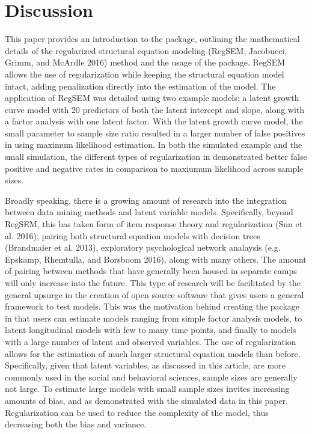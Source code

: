 \documentclass[article]{jss}
\begin{document}
\section{Discussion}\label{discussion}

This paper provides an introduction to the  package,
outlining the mathematical details of the regularized structural
equation modeling (RegSEM; Jacobucci, Grimm, and McArdle 2016) method
and the usage of the  package. RegSEM allows the use of
regularization while keeping the structural equation model intact,
adding penalization directly into the estimation of the model. The
application of RegSEM was detailed using two example models: a latent
growth curve model with 20 predictors of both the latent intercept and
slope, along with a factor analysis with one latent factor. With the
latent growth curve model, the small parameter to sample size ratio
resulted in a larger number of false positives in using maximum
likelihood estimation. In both the simulated example and the small
simulation, the different types of regularization in 
demonstrated better false positive and negative rates in comparison to
maxiumum likelihood across sample sizes.

Broadly speaking, there is a growing amount of research into the
integration between data mining methods and latent variable models.
Specifically, beyond RegSEM, this has taken form of item response theory
and regularization (Sun et al. 2016), pairing both structural equation
models with decision trees (Brandmaier et al. 2013), exploratory
psychological network analaysis (e.g. Epskamp, Rhemtulla, and Borsboom
2016), along with many others. The amount of pairing between methods
that have generally been housed in separate camps will only increase
into the future. This type of research will be facilitated by the
general upsurge in the creation of open source software that gives users
a general framework to test models. This was the motivation behind
creating the  package in that users can estimate models
ranging from simple factor analysis models, to latent longitudinal
models with few to many time points, and finally to models with a large
number of latent and observed variables. The use of regularization
allows for the estimation of much larger structural equation models than
before. Specifically, given that latent variables, as discussed in this
article, are more commonly used in the social and behavioral sciences,
sample sizes are generally not large. To estimate large models with
small sample sizes invites increasing amounts of bias, and as
demonstrated with the simulated data in this paper. Regularization can
be used to reduce the complexity of the model, thus decreasing both the
bias and variance.
\end{document}
